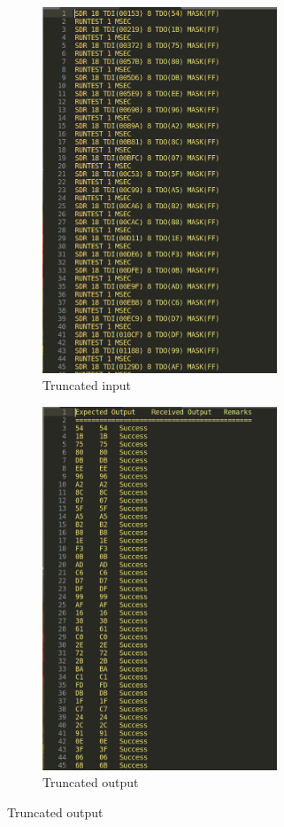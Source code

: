 \documentclass[12pt]{article}
\begin{document}
        \begin{figure}[H]
            \centering
            \begin{subfigure}{.5\textwidth}
                \centering
                \includegraphics[width=70mm]{input.png}
                \caption{Truncated input}
            \end{subfigure}%
            \begin{subfigure}{.5\textwidth}
                \centering
                \includegraphics[width=70mm]{out.png}
                \caption{Truncated output}
            \end{subfigure}%
        \end{figure}
\end{document}
